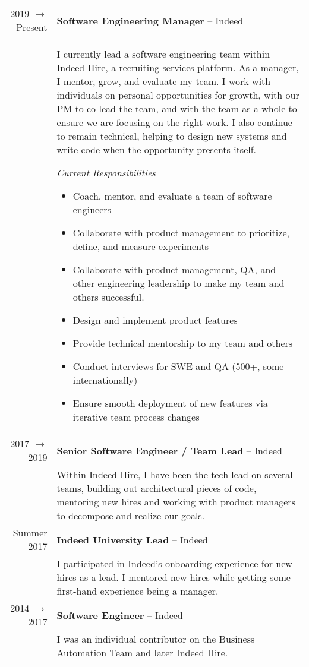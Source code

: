 \documentclass[11pt]{amsart}
\begin{document}
\begin{tabularx}{\textwidth}{@{}r | X@{}}
2019 $\rightarrow$ Present &  \textbf{Software Engineering Manager} – Indeed  \\
& I currently lead a software engineering team within Indeed Hire, a recruiting services platform. As a manager, I mentor, grow, and evaluate my team. I work with individuals on personal opportunities for growth, with our PM to co-lead the team, and with the team as a whole to ensure we are focusing on the right work. I also continue to remain technical, helping to design new systems and write code when the opportunity presents itself. 

\bigskip
\textit{Current Responsibilities}

\begin{itemize}[noitemsep, leftmargin=2em, label=\raisebox{0.25ex}{\tiny$\bullet$}]
\item Coach, mentor, and evaluate a team of software engineers
\item Collaborate with product management to prioritize, define, and measure experiments
\item Collaborate with product management, QA, and other engineering leadership to make my team and others successful.
\item Design and implement product features
\item Provide technical mentorship to my team and others
\item Conduct interviews for SWE and QA (500+, some internationally)
\item Ensure smooth deployment of new features via iterative team process changes
\end{itemize}

\\
2017 $\rightarrow$  2019 &  \textbf{Senior Software Engineer / Team Lead} – Indeed \\ 
& Within Indeed Hire, I have been the tech lead on several teams, building out architectural pieces of code, mentoring new hires and working with product managers to decompose and realize our goals.

\\

Summer 2017  & \textbf{Indeed University Lead} – Indeed \\ 
& I participated in Indeed's onboarding experience for new hires as a lead. I mentored new hires while getting some first-hand experience being a manager.

 \\
2014 $\rightarrow$  2017  & \textbf{Software Engineer} – Indeed \\ 
& I was an individual contributor on the Business Automation Team and later Indeed Hire. \\
\end{tabularx}
\end{document}
